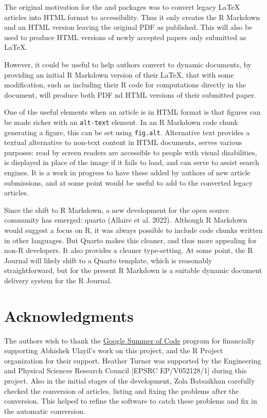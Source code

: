 The original motivation for the  and  packages was to convert legacy LaTeX articles into HTML format to accessibility. Thus it only creates the R Markdown and an HTML version leaving the original PDF as published. This will also be used to produce HTML versions of newly accepted papers only submitted as LaTeX.

However, it could be useful to help authors convert to dynamic documents, by providing an initial R Markdown version of their LaTeX, that with some modification, such as including their R code for computations directly in the document, will produce both PDF nd HTML versions of their submitted paper.

One of the useful elements when an article is in HTML format is that figures can be made richer with an \texttt{alt-text} element. In an R Markdown code chunk generating a figure, this can be set using \texttt{fig.alt}. Alternative text provides a textual alternative to non-text content in HTML documents, serves various purposes: read by screen readers are accessible to people with visual disabilities, is displayed in place of the image if it fails to load, and can serve to assist search engines. It is a work in progress to have these added by authors of new article submissions, and at some point would be useful to add to the converted legacy articles.

Since the shift to R Markdown, a new development for the open source community has emerged: quarto (Allaire et al. 2022). Although R Markdown would suggest a focus on R, it was always possible to include code chunks written in other languages. But Quarto makes this cleaner, and thus more appealing for non-R developers. It also provides a cleaner type-setting. At some point, the R Journal will likely shift to a Quarto template, which is reasonably straightforward, but for the present R Markdown is a suitable dynamic document delivery system for the R Journal.

\hypertarget{acknowledgments}{%
\section*{Acknowledgments}\label{acknowledgments}}

The authors wish to thank the \href{https://summerofcode.withgoogle.com}{Google Summer of Code} program for financially supporting Abhishek Ulayil's work on this project, and the R Project organization for their support. Heather Turner was supported by the Engineering and Physical Sciences Research Council {[}EPSRC EP/V052128/1{]} during this project. Also in the initial stages of the development, Zola Batsaikhan carefully checked the conversion of articles, listing and fixing the problems after the conversion. This helped to refine the software to catch these problems and fix in the automatic conversion.

